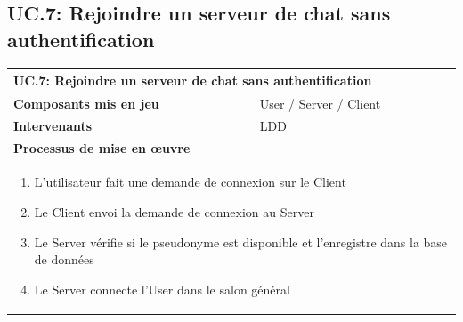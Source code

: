\documentclass[a4paper,11pt,french]{article}
\begin{document}
\subsection{UC.7: Rejoindre un serveur de chat sans authentification}
\begin{center}
	\vspace*{0.7cm}
	\begin{tabularx}{16cm}{|l|X|}
	\hline
	\multicolumn{2}{|l|}{\textbf{UC.7: Rejoindre un serveur de chat sans authentification}}\\
	\hline
	\textbf{Composants mis en jeu} & User / Server / Client \\
	\hline
	\textbf{Intervenants} & LDD \\
	\hline
	\multicolumn{2}{|l|}{\textbf{Processus de mise en \oe uvre}}\\
	\hline
	\multicolumn{2}{|p{15cm}|}{\begin{enumerate}\item L'utilisateur fait une demande de connexion sur le Client \item Le Client envoi la demande de connexion au Server \item Le Server vérifie si le pseudonyme est disponible et l'enregistre dans la base de données \item Le Server connecte l'User dans le salon général\end{enumerate}}\\
	\hline
	\end{tabularx}
\end{center}
\end{document}
